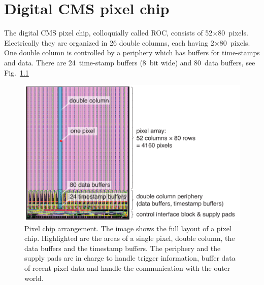\chapter{Digital CMS pixel chip}

The digital CMS pixel chip, colloquially called \gls{ROC}, consists of 52$\times$80~pixels. Electrically they are organized in 26 double columns, each having 2$\times$80~pixels. One double column is controlled by a periphery which has buffers for time-stamps and data. There are 24~time-stamp buffers (8~bit wide) and 80~data buffers, see Fig.~\ref{fig:ROCimage}

\begin{figure}[hbtp]
	\includegraphics[width=.9\textwidth]{img/ROCimage.pdf}
	\caption{Pixel chip arrangement. The image shows the full layout of a pixel chip. Highlighted are the areas of a single pixel, double column, the data buffers and the timestamp buffers. The periphery and the supply pads are in charge to handle trigger information, buffer data of recent pixel data and handle the communication with the outer world.}
	\label{fig:ROCimage}
\end{figure}


